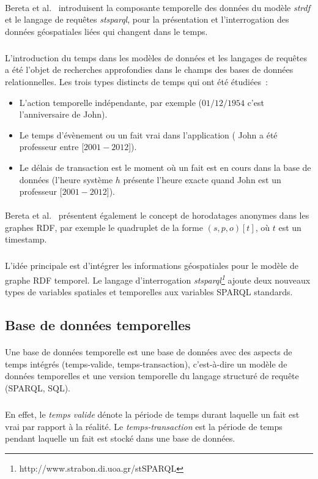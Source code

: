 \paragraph{}
Bereta et al.~\cite{bereta2013} introduisent la composante temporelle des données du modèle {\itshape\gls{strdf}} et le langage de requêtes {\itshape\gls{stsparql}}, pour la présentation et l’interrogation des données géospatiales liées qui changent dans le temps.
\subparagraph{}
L’introduction du temps dans les modèles de données et les langages de requêtes a été l’objet de recherches approfondies dans le champs des bases de données relationnelles.
\newline
Les trois types distincts de temps qui ont été étudiées~:
\begin{itemize}
\item L'action temporelle indépendante, par exemple ($01/12/1954$ c’est l’anniversaire de John).
\item Le temps d’évènement ou un fait vrai dans l’application ( John a été professeur entre [$2001-2012$]).
\item Le délais de transaction est le moment où un fait est en cours dans la base de données (l’heure système $h$ présente l’heure exacte quand John est un professeur [$2001-2012$]).
\end{itemize}
\paragraph{}
Bereta et al.~\cite{bereta2013} présentent également le concept de horodatages anonymes dans les graphes RDF, par exemple le quadruplet de la forme $(s, p, o)[t]$, où $t$ est un timestamp.
\subparagraph{}
L’idée principale est d’intégrer les informations géospatiales pour le modèle de graphe RDF temporel. Le langage d’interrogation{ \it \gls{stsparql}\footnote{http://www.strabon.di.uoa.gr/stSPARQL}} ajoute deux nouveaux types de variables spatiales et temporelles aux variables SPARQL standards.
\subsection{Base de données temporelles}
\paragraph{}
Une base de données temporelle est une base de données avec des aspects de temps intégrés (temps-valide, temps-transaction), c'est-à-dire un modèle de données temporelles et une version temporelle du langage structuré de requête (SPARQL, SQL).
\subparagraph{}
En effet, le \textit{temps valide} dénote la période de temps durant laquelle un fait est vrai par rapport à la réalité.
Le \textit{temps-transaction} est la période de temps pendant laquelle un fait est stocké dans une base de données.
